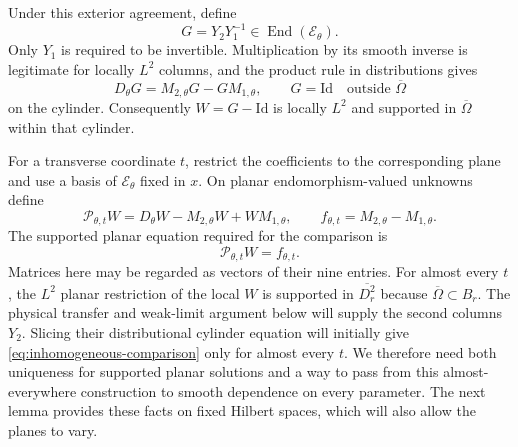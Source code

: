 \documentclass[11pt]{article}
\newcommand{\Id}{\mathrm{Id}}
\newcommand{\Ecal}{\mathcal E}
\newcommand{\Pcal}{\mathcal P}
\theoremstyle{remark}
\numberwithin{equation}{section}
\begin{document}
Under this exterior agreement, define
\[
 G=Y_2Y_1^{-1}\in\operatorname{End}(\Ecal_\theta).
\]
Only $Y_1$ is required to be invertible. Multiplication by its smooth
inverse is legitimate for locally $L^2$ columns, and the product rule
in distributions gives
\[
 D_\theta G=M_{2,\theta}G-GM_{1,\theta},
 \qquad G=\Id\quad\text{outside }\overline\Omega
\]
on the cylinder. Consequently $W=G-\Id$ is locally $L^2$ and supported
in $\overline\Omega$ within that cylinder.

For a transverse coordinate $t$, restrict the coefficients to the
corresponding plane and use a basis of $\Ecal_\theta$ fixed in $x$.
On planar endomorphism-valued unknowns define
\begin{equation}\label{eq:planar-comparison-operator}
 \Pcal_{\theta,t}W
      =D_\theta W-M_{2,\theta}W+WM_{1,\theta},
 \qquad
 f_{\theta,t}=M_{2,\theta}-M_{1,\theta}.
\end{equation}
The supported planar equation required for the comparison is
\begin{equation}\label{eq:inhomogeneous-comparison}
 \Pcal_{\theta,t}W=f_{\theta,t}.
\end{equation}
Matrices here may be regarded as vectors of their nine entries.
For almost every $t$, the $L^2$ planar restriction of the local $W$
is supported in $\overline{D_r^2}$ because $\overline\Omega\subset B_r$.
The physical transfer and weak-limit argument below will supply the
second columns $Y_2$. Slicing their distributional cylinder equation
will initially give \eqref{eq:inhomogeneous-comparison} only for almost
every $t$. We therefore need both uniqueness for supported planar
solutions and a way to pass from this almost-everywhere construction
to smooth dependence on every parameter. The next lemma provides these
facts on fixed Hilbert spaces, which will also allow the planes to vary.
\end{document}
